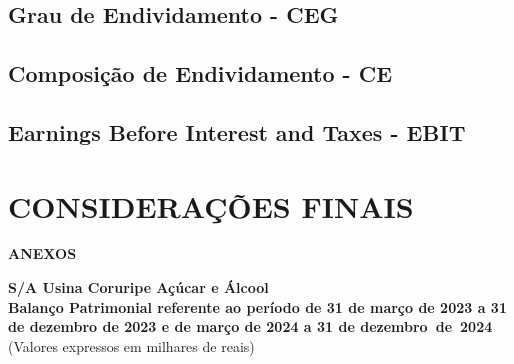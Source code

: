 \documentclass[1pt,a4paper]{article}
\begin{document}
	
	\subsection{Grau de Endividamento - CEG}
	
	\subsection{Composição de Endividamento - CE}
	
	\subsection{Earnings Before Interest and Taxes - EBIT}
	
	\section{CONSIDERAÇÕES FINAIS}
	
	\newpage
	
	\centering \textbf{ANEXOS}
		
		\begin{center}
			\textbf{\Large S/A Usina Coruripe Açúcar e Álcool}\\
			\textbf{Balanço Patrimonial referente ao período de 31 de março de 2023 a 31 de dezembro de 2023 e de março de 2024 a 31 de dezembro de 2024}\\
			(Valores expressos em milhares de reais)
		\end{center}
		
		
		
\end{document}

